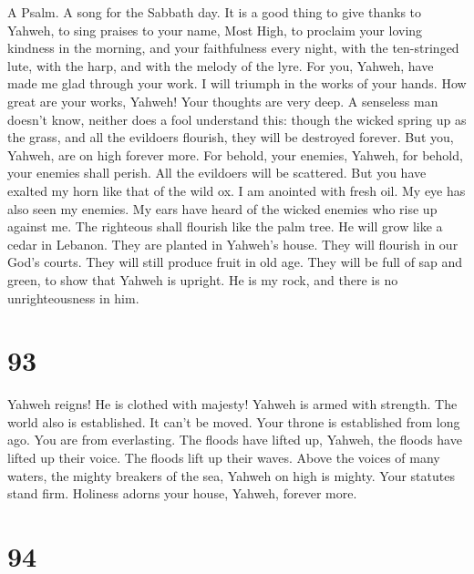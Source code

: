 A Psalm. A song for the Sabbath day.  It is a good thing
to give thanks to Yahweh, to sing praises to your name, Most High,
 to proclaim your loving kindness in the morning, and your
faithfulness every night,  with the ten-stringed lute,
with the harp, and with the melody of the lyre.  For you,
Yahweh, have made me glad through your work. I will triumph in the works
of your hands.  How great are your works, Yahweh! Your
thoughts are very deep.  A senseless man doesn't know,
neither does a fool understand this:  though the wicked
spring up as the grass, and all the evildoers flourish, they will be
destroyed forever.  But you, Yahweh, are on high forever
more.  For behold, your enemies, Yahweh, for behold, your
enemies shall perish. All the evildoers will be scattered.
 But you have exalted my horn like that of the wild ox. I
am anointed with fresh oil.  My eye has also seen my
enemies. My ears have heard of the wicked enemies who rise up against
me.  The righteous shall flourish like the palm tree. He
will grow like a cedar in Lebanon.  They are planted in
Yahweh's house. They will flourish in our God's courts. 
They will still produce fruit in old age. They will be full of sap and
green,  to show that Yahweh is upright. He is my rock,
and there is no unrighteousness in him.

\hypertarget{section-85}{%
\section{93}\label{section-85}}

 Yahweh reigns! He is clothed with majesty! Yahweh is
armed with strength. The world also is established. It can't be moved.
 Your throne is established from long ago. You are from
everlasting.  The floods have lifted up, Yahweh, the
floods have lifted up their voice. The floods lift up their waves.
 Above the voices of many waters, the mighty breakers of
the sea, Yahweh on high is mighty.  Your statutes stand
firm. Holiness adorns your house, Yahweh, forever more.

\hypertarget{section-86}{%
\section{94}\label{section-86}}


